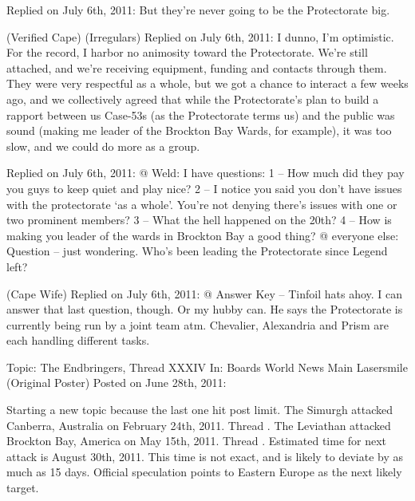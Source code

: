 Replied on July 6th, 2011:
But they're never going to be the Protectorate big.



\blacktriangleright {} (Verified Cape) (Irregulars)
Replied on July 6th, 2011:
I dunno, I'm optimistic. \winky
For the record, I harbor no animosity toward the Protectorate.  We're still attached, and we're receiving equipment, funding and contacts through them.  They were very respectful as a whole, but we got a chance to interact a few weeks ago, and we collectively agreed that while the Protectorate's plan to build a rapport between us Case-53s (as the Protectorate terms us) and the public was sound (making me leader of the Brockton Bay Wards, for example), it was too slow, and we could do more as a group.



\blacktriangleright {}
Replied on July 6th, 2011:
@ Weld:
I have questions:
1 – How much did they pay you guys to keep quiet and play nice?
2 – I notice you said you don't have issues with the protectorate `as a whole'.  You're not denying there's issues with one or two prominent members?
3 – What the hell happened on the 20th?
4 – How is making you leader of the wards in Brockton Bay a good thing?
@ everyone else:
Question – just wondering.  Who's been leading the Protectorate since Legend left?



(Cape Wife)
Replied on July 6th, 2011:
@ Answer Key – Tinfoil hats ahoy.  I can answer that last question, though.  Or my hubby can.  He says the Protectorate is currently being run by a joint team atm.  Chevalier, Alexandria and Prism are each handling different tasks.






\sectionbreak



\blacklozenge  Topic:  The Endbringers, Thread XXXIV
In:  Boards \blacktriangleright World News \blacktriangleright Main
Lasersmile (Original Poster)
Posted on June 28th, 2011:



Starting a new topic because the last one hit post limit.
The Simurgh attacked Canberra, Australia on February 24th, 2011.  Thread \underline{}.
The Leviathan attacked Brockton Bay, America on May 15th, 2011.  Thread \underline{}.
Estimated time for next attack is August 30th, 2011.  This time is not exact, and is likely to deviate by as much as 15 days.
Official speculation points to Eastern Europe as the next likely target.



